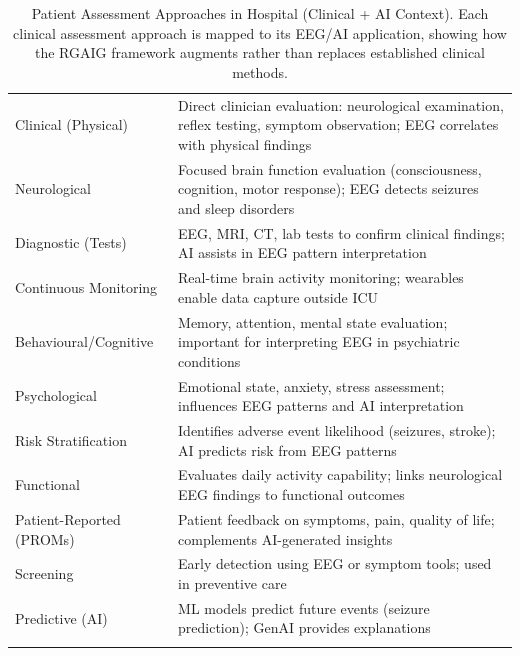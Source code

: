 {\tablestripes\tablefontsize
{}
\begin{xltabular}{\textwidth}{@{} >{\raggedright\arraybackslash}p{3.2cm} L @{}}
\caption[Patient Assessment Approaches in Hospital (Clinical + AI]{Patient Assessment Approaches in Hospital (Clinical + AI Context). Each clinical assessment approach is mapped to its EEG/AI application, showing how the RGAIG framework augments rather than replaces established clinical methods.}\label{tab:patient_assessment} \\
\toprule
{} &  \\
\midrule
\endfirsthead
\endhead
\bottomrule
\endlastfoot
Clinical (Physical) & Direct clinician evaluation: neurological examination, reflex testing, symptom observation; EEG correlates with physical findings \\
\addlinespace
Neurological & Focused brain function evaluation (consciousness, cognition, motor response); EEG detects seizures and sleep disorders \\
\addlinespace
Diagnostic (Tests) & EEG, MRI, CT, lab tests to confirm clinical findings; AI assists in EEG pattern interpretation \\
\addlinespace
Continuous Monitoring & Real-time brain activity monitoring; wearables enable data capture outside ICU \\
\addlinespace
Behavioural/Cognitive & Memory, attention, mental state evaluation; important for interpreting EEG in psychiatric conditions \\
\addlinespace
Psychological & Emotional state, anxiety, stress assessment; influences EEG patterns and AI interpretation \\
\addlinespace
Risk Stratification & Identifies adverse event likelihood (seizures, stroke); AI predicts risk from EEG patterns \\
\addlinespace
Functional & Evaluates daily activity capability; links neurological EEG findings to functional outcomes \\
\addlinespace
Patient-Reported (PROMs) & Patient feedback on symptoms, pain, quality of life; complements AI-generated insights \\
\addlinespace
Screening & Early detection using EEG or symptom tools; used in preventive care \\
\addlinespace
Predictive (AI) & ML models predict future events (seizure prediction); GenAI provides explanations \\
\addlinespace

\end{xltabular}}
